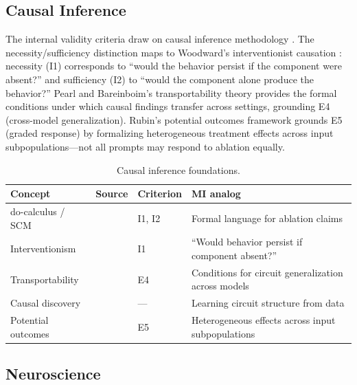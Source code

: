 \documentclass[10pt]{article}
\begin{document}
\subsection{Causal Inference}
\label{sec:causal}

The internal validity criteria draw on causal inference methodology \citep{pearl2009causality, spirtes2000causation}. The necessity/sufficiency distinction maps to Woodward's interventionist causation \citep{woodward2003making}: necessity (I1) corresponds to ``would the behavior persist if the component were absent?'' and sufficiency (I2) to ``would the component alone produce the behavior?'' Pearl and Bareinboim's transportability theory \citep{pearl2011transportability} provides the formal conditions under which causal findings transfer across settings, grounding E4 (cross-model generalization). Rubin's potential outcomes framework grounds E5 (graded response) by formalizing heterogeneous treatment effects across input subpopulations---not all prompts may respond to ablation equally.

\begin{table}[H]
\centering\small
\caption{Causal inference foundations.}
\renewcommand{\arraystretch}{1.12}
\begin{tabular}{@{}l>{\raggedright\arraybackslash}p{2.5cm}l>{\raggedright\arraybackslash}p{4.2cm}@{}}
\toprule
\textbf{Concept} & \textbf{Source} & \textbf{Criterion} & \textbf{MI analog} \\
\midrule
do-calculus / SCM & \citet{pearl2009causality} & I1, I2 & Formal language for ablation claims \\
\midrule
Interventionism & \citet{woodward2003making} & I1 & ``Would behavior persist if component absent?'' \\
\midrule
Transportability & \citet{pearl2011transportability} & E4 & Conditions for circuit generalization across models \\
\midrule
Causal discovery & \citet{spirtes2000causation} & --- & Learning circuit structure from data \\
\midrule
Potential outcomes & \citet{rubin1974estimating} & E5 & Heterogeneous effects across input subpopulations \\
\bottomrule
\end{tabular}
\end{table}


\subsection{Neuroscience}
\label{sec:neuro}
\end{document}
